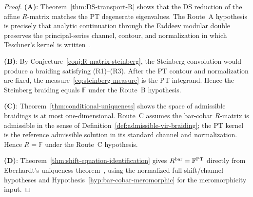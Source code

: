 \begin{proof}
\textbf{(A)}: Theorem~\ref{thm:DS-transport-R} shows that the DS
reduction of the affine $R$-matrix matches the PT degenerate
eigenvalues. The Route~A hypothesis is precisely that analytic
continuation through the Faddeev modular double preserves the
principal-series channel, contour, and normalization in which
Teschner's kernel is written~\cite{TeschnerLiouville}.

\textbf{(B)}: By Conjecture~\ref{conj:R-matrix-steinberg}, the
Steinberg convolution would produce a braiding satisfying (R1)--(R3).
After the PT contour and normalization are fixed, the
measure~\eqref{eq:steinberg-measure} is the PT integrand. Hence the
Steinberg braiding equals $\mathbb{F}$ under the Route~B hypothesis.

\textbf{(C)}: Theorem~\ref{thm:conditional-uniqueness} shows the
space of admissible braidings is at most one-dimensional. Route~C
assumes the bar-cobar $R$-matrix is admissible in the sense of
Definition~\ref{def:admissible-vir-braiding}; the PT kernel is the
reference admissible solution in its standard channel and
normalization. Hence $R = \mathbb{F}$ under the Route~C hypothesis.

\textbf{(D)}: Theorem~\ref{thm:shift-equation-identification}
gives $R^{\mathrm{bar}} = \mathbb{F}^{\mathrm{PT}}$ directly from
Eberhardt's uniqueness theorem~\cite{Eberhardt23}, using the
normalized full shift/channel hypotheses and
Hypothesis~\ref{hyp:bar-cobar-meromorphic} for the meromorphicity
input.
\end{proof}

